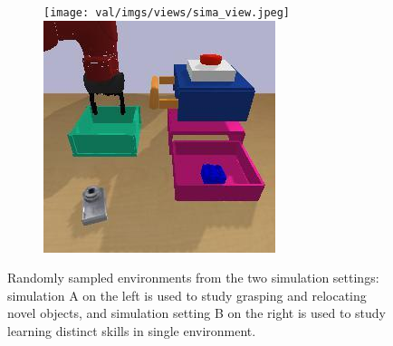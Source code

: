\begin{figure}[t]
    \centering
    \begin{subfigure}[b]{0.99\linewidth}
        \center
        \texttt{[image: val/imgs/views/sima\_view.jpeg]}
        \includegraphics[height=0.3\textwidth]{val/imgs/views/simb_view.jpeg}
    \end{subfigure}

    \caption{Randomly sampled environments from the two simulation settings: simulation A on the left is used to study grasping and relocating novel objects, and simulation setting B on the right is used to study learning distinct skills in single environment.}
    \label{fig:env_views}
    \vspace{-0.5cm}
\end{figure}